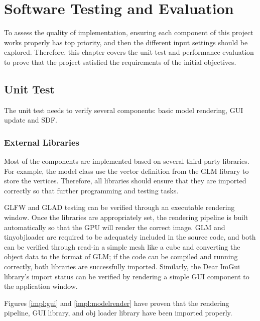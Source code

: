 \chapter{Software Testing and Evaluation}
\label{chap5}

To assess the quality of implementation, ensuring each component of this project works properly has top priority, and then the different input settings should be explored. Therefore, this chapter covers the unit test and performance evaluation to prove that the project satisfied the requirements of the initial objectives.

\section{Unit Test}

The unit test needs to verify several components: basic model rendering, GUI update and SDF.

\subsection{External Libraries}

Most of the components are implemented based on several third-party libraries. For example, the model class use the vector definition from the GLM library to store the vertices. Therefore, all libraries should ensure that they are imported correctly so that further programming and testing tasks.

\hspace*{\fill}

GLFW and GLAD testing can be verified through an executable rendering window. Once the libraries are appropriately set, the rendering pipeline is built automatically so that the GPU will render the correct image. GLM and tinyobjloader are required to be adequately included in the source code, and both can be verified through read-in a simple mesh like a cube and converting the object data to the format of GLM; if the code can be compiled and running correctly, both libraries are successfully imported. Similarly, the Dear ImGui library's import status can be verified by rendering a simple GUI component to the application window.

\hspace*{\fill}

Figures \ref{impl:gui} and \ref{impl:modelrender} have proven that the rendering pipeline, GUI library, and obj loader library have been imported properly.


